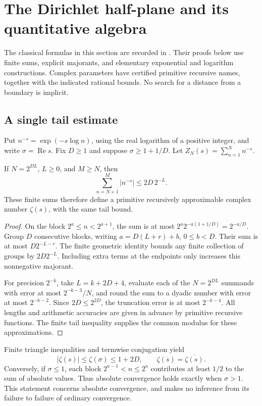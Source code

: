 \section{The Dirichlet half-plane and its quantitative algebra}
\label{sec:dirichlet}

The classical formulas in this section are recorded in
\cite[\S\S25.2,25.8]{DLMF}. Their proofs below use finite sums, explicit
majorants, and elementary exponential and logarithm constructions.
Complex parameters have certified primitive recursive names, together
with the indicated rational bounds. No search for a distance from a
boundary is implicit.

\subsection{A single tail estimate}

Put \(n^{-s}=\exp(-s\log n)\), using the real logarithm of a positive
integer, and write \(\sigma=\operatorname{Re}s\).
Fix \(D\geq1\) and suppose \(\sigma\geq1+1/D\).
Let \(Z_N(s)=\sum_{n=1}^N n^{-s}\).

\begin{lemma}\label{lem:d-tail}
If \(N=2^{DL}\), \(L\geq0\), and \(M\geq N\), then
\[
 \sum_{n=N+1}^{M}|n^{-s}|\leq2D\,2^{-L}.                 \tag{D1}\label{eq:d-tail}
\]
These finite sums therefore define a primitive recursively approximable
complex number \(\zeta(s)\), with the same tail bound.
\end{lemma}
\begin{proof}
On the block \(2^a\leq n<2^{a+1}\), the sum is at most
\(2^a2^{-a(1+1/D)}=2^{-a/D}\).
Group \(D\) consecutive blocks, writing \(a=D(L+r)+b\), \(0\leq b<D\).
Their sum is at most \(D2^{-L-r}\). The finite geometric identity bounds
any finite collection of groups by \(2D2^{-L}\). Including extra terms
at the endpoints only increases this nonnegative majorant.

For precision \(2^{-k}\), take \(L=k+2D+4\), evaluate each of the
\(N=2^{DL}\) summands with error at most \(2^{-k-3}/N\), and round the
sum to a dyadic number with error at most \(2^{-k-2}\).
Since \(2D\leq2^{2D}\), the truncation error is at most \(2^{-k-4}\).
All lengths and arithmetic accuracies are given in advance by primitive
recursive functions. The finite tail inequality supplies the common
modulus for these approximations.
\end{proof}

Finite triangle inequalities and termwise conjugation yield
\[
 |\zeta(s)|\leq\zeta(\sigma)\leq1+2D,\qquad
 \zeta(\overline s)=\overline{\zeta(s)}.                 \tag{D2}\label{eq:d-bound}
\]
Conversely, if \(\sigma\leq1\), each block
\(2^{a-1}<n\leq2^a\) contributes at least \(1/2\) to the sum of absolute
values. Thus absolute convergence holds exactly when \(\sigma>1\).
This statement concerns absolute convergence, and makes no inference
from its failure to failure of ordinary convergence.

